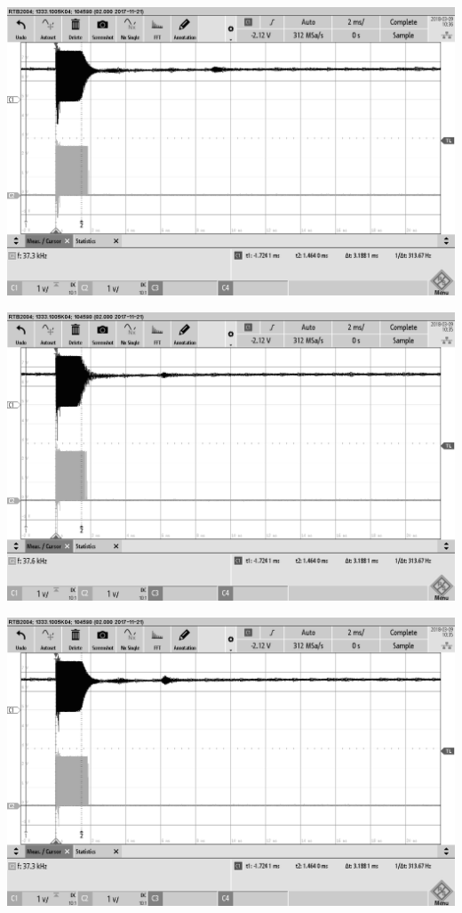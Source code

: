 \begin{minipage}{0.5\textwidth}
\includegraphics[width=1\textwidth, draft
]{Abbildungen/MessungenP2/4,6V/MURATAr1,5m.png}
\label{fig:MURATA reciver 1,5m}
\end{minipage}
\begin{minipage}{0.5\textwidth}
\includegraphics[width=1\textwidth, draft
]{Abbildungen/MessungenP2/4,6V/MURATAs1m.png}
\label{fig:MURATA sender 1m}
\end{minipage}
\begin{minipage}{0.5\textwidth}
\includegraphics[width=1\textwidth, draft
]{Abbildungen/MessungenP2/4,6V/MURATAr1m.png}
\label{fig:MURATA sender+reciver}
\end{minipage}
